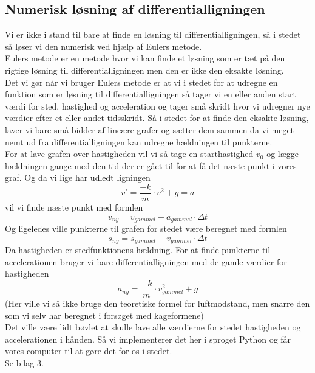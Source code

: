 \documentclass[12pt]{article}
\begin{document}
\subsection{Numerisk løsning af differentialligningen}
Vi er ikke i stand til bare at finde en løsning til differentialligningen, så i stedet så løser vi den numerisk ved hjælp af Eulers metode.\\
Eulers metode er en metode hvor vi kan finde et løsning som er tæt på den rigtige løsning til differentialligningen men den er ikke den eksakte løsning.\\
Det vi gør når vi bruger Eulers metode er at vi i stedet for at udregne en funktion som er løsning til differentialligningen så tager vi en eller anden start
værdi for sted, hastighed og acceleration og tager små skridt hvor vi udregner nye værdier efter et eller andet tidsskridt.
Så i stedet for at finde den eksakte løsning, laver vi bare små bidder af lineære grafer og sætter dem sammen da vi meget nemt ud fra differentialligningen kan udregne hældningen til punkterne.\\
For at lave grafen over hastigheden vil vi så tage en starthastighed $v_0$ og lægge hældningen gange med den tid der er gået til for at få det næste punkt i vores graf. Og da vi lige har udledt
ligningen
$$v'=\frac{-k}{m}\cdot v^2 + g = a$$
vil vi finde næste punkt med formlen
$$v_{ny}=v_{gammel}+a_{gammel} \cdot \Delta t$$
Og ligeledes ville punkterne til grafen for stedet være beregnet med formlen
$$s_{ny}=s_{gammel}+v_{gammel} \cdot \Delta t$$
Da hastigheden er stedfunktionens hældning.
For at finde punkterne til accelerationen bruger vi bare differentialligningen med de gamle værdier for hastigheden
$$a_{ny}=\frac{-k}{m} \cdot v_{gammel}^2+g$$
(Her ville vi så ikke bruge den teoretiske formel for luftmodstand, men snarre den som vi selv har beregnet i forsøget med kageformene)\\
Det ville være lidt bøvlet at skulle lave alle værdierne for stedet hastigheden og accelerationen i hånden. Så vi implementerer det her i sproget Python og får vores computer til at gøre det for os
i stedet.\\
Se bilag 3.
\end{document}
